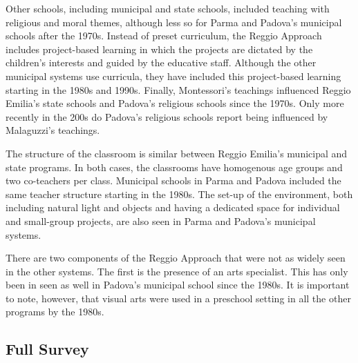 Other schools, including municipal and state schools, included teaching with religious and moral themes, although less so for Parma and Padova's municipal schools after the 1970s. Instead of preset curriculum, the Reggio Approach includes project-based learning in which the projects are dictated by the children's interests and guided by the educative staff. Although the other municipal systems use curricula, they have included this project-based learning starting in the 1980s and 1990s. Finally, Montessori's teachings influenced Reggio Emilia's state schools and Padova's religious schools since the 1970s. Only more recently in the 200s do Padova's religious schools report being influenced by Malaguzzi's teachings. 

The structure of the classroom is similar between Reggio Emilia's municipal and state programs. In both cases, the classrooms have homogenous age groups and two co-teachers per class. Municipal schools in Parma and Padova included the same teacher structure starting in the 1980s. The set-up of the environment, both including natural light and objects and having a dedicated space for individual and small-group projects, are also seen in Parma and Padova's municipal systems.

There are two components of the Reggio Approach that were not as widely seen in the other systems. The first is the presence of an arts specialist. This has only been in seen as well in Padova's municipal school since the 1980s. It is important to note, however, that visual arts were used in a preschool setting in all the other programs by the 1980s.  

\subsection{Full Survey}

